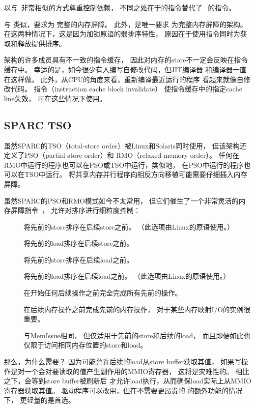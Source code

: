 \Power{}以与\ARM\ 非常相似的方式尊重控制依赖，
不同之处在于\Power{}的指令替代了
\ARM\ 的指令。

与 类似，\Power{}要求为
完整的内存屏障。
此外，\Power{}是唯一要求
为完整内存屏障的架构。
在这两种情况下，这是因为\Power{}加锁原语的弱排序特性，
原因在于使用指令同时为获取和释放提供排序。

\Power{}架构的许多成员具有不一致的指令缓存，
因此对内存的store不一定会反映在指令缓存中。
幸运的是，如今很少有人编写自修改代码，但JIT编译器
和编译器一直在这样做。
此外，从CPU的角度来看，重新编译最近运行的程序
看起来就像自修改代码。
指令（instruction cache block invalidate）
使指令缓存中的指定cache line失效，
可在这些情况下使用。

\subsection{SPARC TSO}

虽然SPARC的TSO（total-store order）被Linux和Solaris同时使用，
但该架构还定义了PSO（partial store order）和
RMO（relaxed-memory order）。
任何在RMO中运行的程序也可以在PSO或TSO中运行，类似地，
在PSO中运行的程序也可以在TSO中运行\@。
将共享内存并行程序向相反方向移植可能需要仔细插入内存屏障。

虽然SPARC的PSO和RMO模式如今不太常用，
但它们催生了一个非常灵活的内存屏障指令~\cite{SPARC94}，
允许对排序进行细粒度控制：
\begin{description}
\item	[] 将先前的store排序在后续store之前。
	（此选项由Linux的原语使用。）
\item	[] 将先前的load排序在后续store之前。
\item	[] 将先前的store排序在后续load之前。
\item	[] 将先前的load排序在后续load之前。
	（此选项由Linux的原语使用。）
\item	[] 在开始任何后续操作之前完全完成所有先前的操作。
\item	[] 在后续内存操作之前完成先前的内存操作，
	对于某些内存映射I/O的实例很重要。
\item	[] 与MemIssue相同，
	但仅适用于先前的store和后续的load，
	而且即便如此也仅限于访问相同内存位置的store和load。
\end{description}

那么，为什么需要？
因为可能允许后续的load从store buffer获取其值，
如果写操作是对一个会对要读取的值产生副作用的MMIO寄存器，
这将是灾难性的。
相比之下，会等到store buffer被刷新后
才允许load执行，从而确保load实际上从MMIO寄存器获取其值。
驱动程序可以改用，但在不需要更昂贵的
的额外功能的情况下，
更轻量的是首选。

